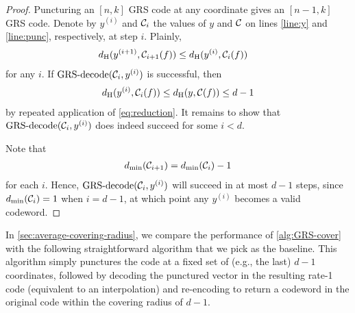 \documentclass[conference]{IEEEtran}
\begin{document}
\begin{proof}
    Puncturing an $[n, k]$ GRS code at any coordinate gives an $[n - 1, k]$ GRS code. 
    Denote by $y^{(i)}$ and ${\mathcal C}_{i}$ the %
    values of $y$ and ${\mathcal C}$ on lines \ref{line:y} and \ref{line:punc}, respectively, at step $i$. %
    Plainly,
    \begin{align}
        d_{{\rm H}}(y^{(i+1)}, {\mathcal C}_{i + 1}(f)) 
        &\le d_{{\rm H}}(y^{(i)}, {\mathcal C}_{i}(f)) 
        \label{eq:reduction}
    \end{align}
    for any $i$. 
    If $\operatorname{GRS-decode}({\mathcal C}_{i}, y^{(i)})$ %
    is successful, then 
    \begin{align*}
        d_{{\rm H}}(y^{(i)}, {\mathcal C}_{i}(f)) \le d_{{\rm H}}(y, {\mathcal C}(f)) \le d - 1 
    \end{align*}
    by repeated application of \eqref{eq:reduction}. 
    It remains to show that $\operatorname{GRS-decode}({\mathcal C}_{i}, y^{(i)})$ does indeed succeed for some $i < d$. 
    
    Note that 
    \begin{align}
        d_{\min}(\CC_{i + 1}) = d_{\min}(\CC_{i}) - 1%
        \label{eq:dmin-reduction}
    \end{align}
    for each $i$. 
    Hence, $\operatorname{GRS-decode}({\mathcal C}_{i}, y^{(i)})$ will succeed in at most $d - 1$ steps, since $d_{\min}({\mathcal C}_{i}) = 1$ when $i = d - 1$, at which point any $y^{(i)}$ becomes a valid codeword.
\end{proof}

In \autoref{sec:average-covering-radius}, we compare the performance of \autoref{alg:GRS-cover} with the following straightforward algorithm that we pick as the baseline. This algorithm simply punctures the code at a fixed set of (e.g., the last) $d - 1$ coordinates, followed by decoding the punctured vector in the resulting rate-1 code (equivalent to an interpolation) and re-encoding to return a codeword in the original code within the covering radius of $d-1$. 

\end{document}
